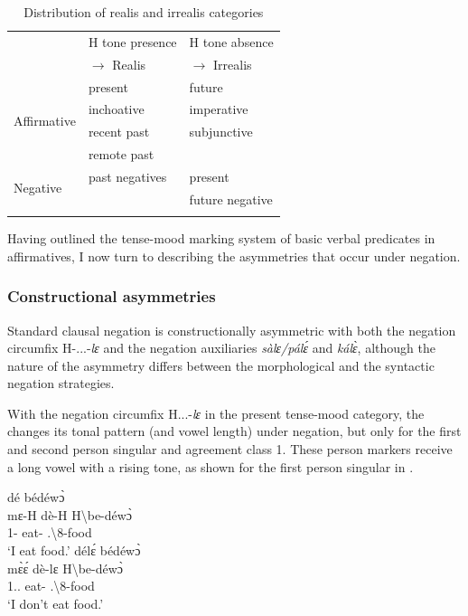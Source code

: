\documentclass[output=paper,colorlinks=true, citecolor=brown,draftmode]{langscibook}
\begin{document}
\begin{table}
    \caption{Distribution of realis and irrealis categories}
    \label{tab:3:moods}
    \begin{tabular}{lll}
        \lsptoprule
         & H tone presence & H tone absence\\
         & $\rightarrow$ Realis & $\rightarrow$ Irrealis\\
         \midrule
        \multirow{4}{*}{Affirmative} & present & future \\
        & inchoative & imperative  \\
        & recent past  & subjunctive \\
        & remote past &  \\
        \midrule 
        \multirow{2}{*}{Negative} & past negatives & present\\
         &  & future negative \\
         \lspbottomrule
    \end{tabular}
\end{table}

Having outlined the tense-mood marking system of basic verbal predicates in affirmatives, I now turn to describing the asymmetries that occur under negation. 

\subsubsection{Constructional asymmetries}
\label{sec:gye:CA}

Standard clausal negation is constructionally asymmetric with both the negation circumfix H-...-{\itshape lɛ} and the negation auxiliaries {\itshape sàlɛ/pálɛ́} and {\itshape kálɛ̀}, although the nature of the asymmetry differs between the morphological and the syntactic negation strategies. 

With the negation circumfix H...-{\itshape lɛ} in the present tense-mood category, the {\STAMP} changes its tonal pattern (and vowel length) under negation, but only for the first and second person singular and agreement class 1. These person markers receive a long vowel with a rising tone, as shown for the first person singular in . 

\ea\label{CA}
\ea\label{CA3}
 dé bédéwɔ̀ \\ 
          mɛ-H dè-H {H\backslash{}be-déwɔ̀}\\
             1{\SG}-{\PRS} eat-{\R} {{\OBJ}.{\LINK}\backslash{}8-food}\\
    \trans `I eat food.'
     \ex\label{CA4}
 délɛ́ bédéwɔ̀ \\
          mɛ̀ɛ́ dè-lɛ {H\backslash{}be-déwɔ̀}\\
             1{\SG}.{\PRS}.{\NEG} eat-{\NEG} {{\OBJ}.{\LINK}\backslash{}8-food}\\
    \trans `I don't eat food.'
\z
\z
\end{document}
